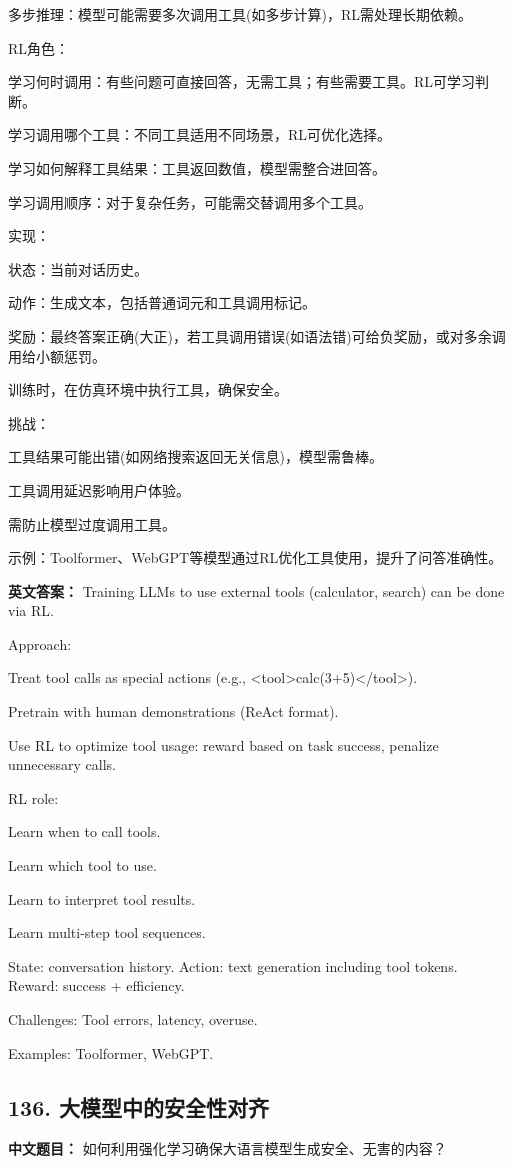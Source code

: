 \documentclass[10pt,a4paper]{ctexart}
\begin{document}
多步推理：模型可能需要多次调用工具(如多步计算)，RL需处理长期依赖。

RL角色：

学习何时调用：有些问题可直接回答，无需工具；有些需要工具。RL可学习判断。

学习调用哪个工具：不同工具适用不同场景，RL可优化选择。

学习如何解释工具结果：工具返回数值，模型需整合进回答。

学习调用顺序：对于复杂任务，可能需交替调用多个工具。

实现：

状态：当前对话历史。

动作：生成文本，包括普通词元和工具调用标记。

奖励：最终答案正确(大正)，若工具调用错误(如语法错)可给负奖励，或对多余调用给小额惩罚。

训练时，在仿真环境中执行工具，确保安全。

挑战：

工具结果可能出错(如网络搜索返回无关信息)，模型需鲁棒。

工具调用延迟影响用户体验。

需防止模型过度调用工具。

示例：Toolformer、WebGPT等模型通过RL优化工具使用，提升了问答准确性。

\textbf{英文答案：}
Training LLMs to use external tools (calculator, search) can be done via RL.

Approach:

Treat tool calls as special actions (e.g., <tool>calc(3+5)</tool>).

Pretrain with human demonstrations (ReAct format).

Use RL to optimize tool usage: reward based on task success, penalize unnecessary calls.

RL role:

Learn when to call tools.

Learn which tool to use.

Learn to interpret tool results.

Learn multi-step tool sequences.

State: conversation history. Action: text generation including tool tokens. Reward: success + efficiency.

Challenges: Tool errors, latency, overuse.

Examples: Toolformer, WebGPT.

\subsection*{136. 大模型中的安全性对齐}
\textbf{中文题目：} 如何利用强化学习确保大语言模型生成安全、无害的内容？
\end{document}
